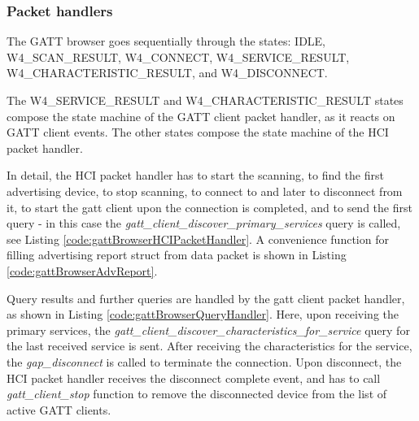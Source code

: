 \documentclass[a4paper,titlepage,oneside,12pt]{amsart} %
\begin{document}
\subsubsection{Packet handlers}
The GATT browser goes sequentially through the states: IDLE, W4\_SCAN\_RESULT, W4\_CONNECT,  W4\_SERVICE\_RESULT,  
\\ W4\_CHARACTERISTIC\_RESULT, and W4\_DISCONNECT. 

The W4\_SERVICE\_RESULT and W4\_CHARACTERISTIC\_RESULT states compose the state machine of the GATT client packet handler, as it reacts on GATT client events. The other states compose the state machine of the HCI packet handler.

In detail, the HCI packet handler has to start the scanning, to find the first advertising device, to stop scanning, to connect to and later to disconnect from it, to start the gatt client upon the connection is completed, and to send the first query - in this case the \emph{gatt\_client\_discover\_primary\_services} query is called, see Listing \ref{code:gattBrowserHCIPacketHandler}. A convenience function for filling advertising report struct from data packet is shown in Listing \ref{code:gattBrowserAdvReport}. 

Query results and further queries are handled by the gatt client packet handler, as shown in Listing \ref{code:gattBrowserQueryHandler}. Here, upon receiving the primary services,  the \emph{gatt\_client\_discover\_characteristics\_for\_service} query for the last received service is sent. After receiving the characteristics for the service, the \emph{gap\_disconnect} is called to terminate the connection. Upon disconnect, the HCI packet handler receives the disconnect complete event, and has to call \emph{gatt\_client\_stop} function to remove the disconnected device from the list of active GATT clients.
\end{document}
